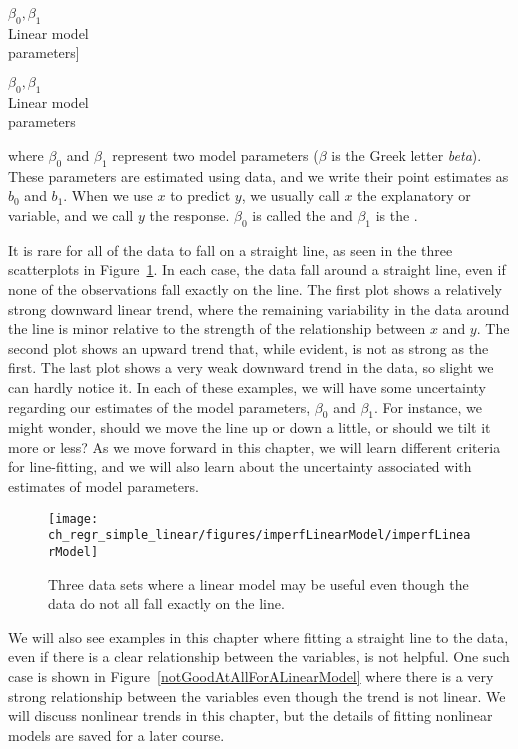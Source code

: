 $\beta_0, \beta_1$\vspace{0.7mm}\\\footnotesize Linear model\\ parameters]{\raggedright\vspace{-10mm}

$\beta_0, \beta_1$\vspace{0.7mm}\\\footnotesize Linear model\\ parameters}where $\beta_0$ and $\beta_1$ represent two model parameters ($\beta$ is the Greek letter \emph{beta}). These parameters are estimated using data, and we write their point estimates as $b_0$ and $b_1$. When we use $x$ to predict $y$, we usually call $x$ the explanatory or  variable, and we call $y$ the response. $\beta_0$ is called the  and $\beta_1$ is the .

It is rare for all of the data to fall on a straight line, as seen in the three scatterplots in Figure~\ref{imperfLinearModel}. In each case, the data fall around a straight line, even if none of the observations fall exactly on the line. The first plot shows a relatively strong downward linear trend, where the remaining variability in the data around the line is minor relative to the strength of the relationship between $x$ and $y$. The second plot shows an upward trend that, while evident, is not as strong as the first. The last plot shows a very weak downward trend in the data, so slight we can hardly notice it. In each of these examples, we will have some uncertainty regarding our estimates of the model parameters, $\beta_0$ and $\beta_1$. For instance, we might wonder, should we move the line up or down a little, or should we tilt it more or less? As we move forward in this chapter, we will learn different criteria for line-fitting, and we will also learn about the uncertainty associated with estimates of model parameters.

\begin{figure}
   \centering
   \texttt{[image: ch\_regr\_simple\_linear/figures/imperfLinearModel/imperfLinearModel]}
   \caption{Three data sets where a linear model may be useful even though the data do not all fall exactly on the line.}
   \label{imperfLinearModel}
\end{figure}

We will also see examples in this chapter where fitting a straight line to the data, even if there is a clear relationship between the variables, is not helpful. One such case is shown in Figure~\ref{notGoodAtAllForALinearModel} where there is a very strong relationship between the variables even though the trend is not linear. We will discuss nonlinear trends in this chapter, but the details of fitting nonlinear models are saved for a later course.

